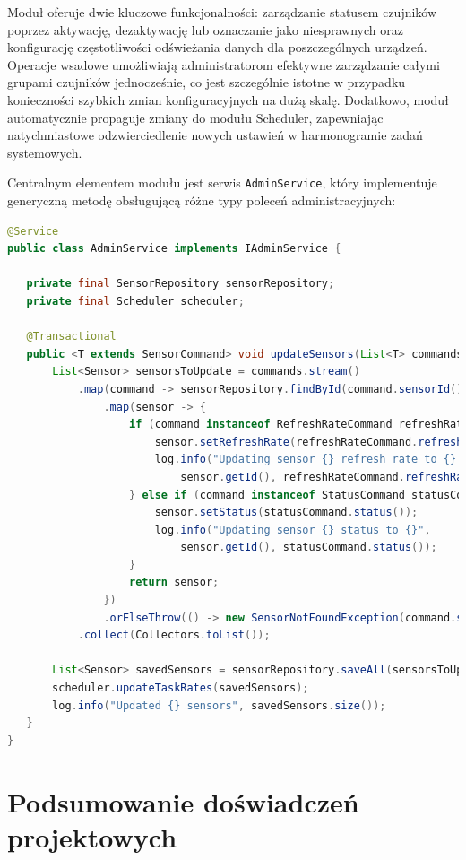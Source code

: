 \documentclass[a4paper,12pt,openany]{book}
\begin{document}
Moduł oferuje dwie kluczowe funkcjonalności: zarządzanie statusem czujników poprzez aktywację, dezaktywację lub oznaczanie jako niesprawnych oraz konfigurację częstotliwości odświeżania danych dla poszczególnych urządzeń. Operacje wsadowe umożliwiają administratorom efektywne zarządzanie całymi grupami czujników jednocześnie, co jest szczególnie istotne w przypadku konieczności szybkich zmian konfiguracyjnych na dużą skalę. Dodatkowo, moduł automatycznie propaguje zmiany do modułu Scheduler, zapewniając natychmiastowe odzwierciedlenie nowych ustawień w harmonogramie zadań systemowych.

Centralnym elementem modułu jest serwis \texttt{AdminService}, który implementuje generyczną metodę obsługującą różne typy poleceń administracyjnych:

\begin{lstlisting}[language=java,caption={Serwis Admin z metodą aktualizacji wsadowej},label={lst:admin-service}]
@Service
public class AdminService implements IAdminService {

   private final SensorRepository sensorRepository;
   private final Scheduler scheduler;

   @Transactional
   public <T extends SensorCommand> void updateSensors(List<T> commands) {
       List<Sensor> sensorsToUpdate = commands.stream()
           .map(command -> sensorRepository.findById(command.sensorId())
               .map(sensor -> {
                   if (command instanceof RefreshRateCommand refreshRateCommand) {
                       sensor.setRefreshRate(refreshRateCommand.refreshRate());
                       log.info("Updating sensor {} refresh rate to {} seconds",
                           sensor.getId(), refreshRateCommand.refreshRate());
                   } else if (command instanceof StatusCommand statusCommand) {
                       sensor.setStatus(statusCommand.status());
                       log.info("Updating sensor {} status to {}",
                           sensor.getId(), statusCommand.status());
                   }
                   return sensor;
               })
               .orElseThrow(() -> new SensorNotFoundException(command.sensorId())))
           .collect(Collectors.toList());

       List<Sensor> savedSensors = sensorRepository.saveAll(sensorsToUpdate);
       scheduler.updateTaskRates(savedSensors);
       log.info("Updated {} sensors", savedSensors.size());
   }
}
\end{lstlisting}

\chapter{Podsumowanie doświadczeń projektowych}
\end{document}
